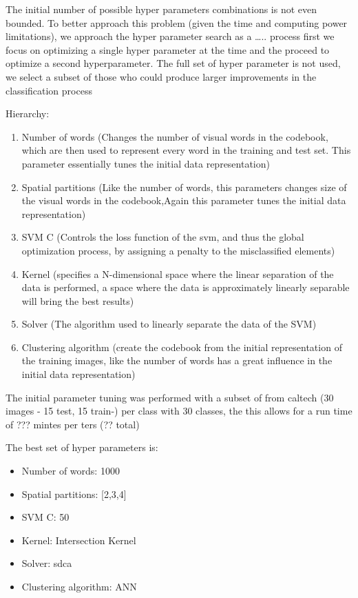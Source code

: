 \documentclass[10pt,twocolumn,letterpaper]{article}
\begin{document}
The initial number of possible hyper parameters combinations is not even bounded. To better approach this problem (given the time and computing power limitations), we approach the hyper parameter search as a ….. process first we focus on optimizing a single hyper parameter at the time and the proceed to optimize a second hyperparameter. The full set of hyper parameter is not used, we select a subset of those who could produce larger improvements in the classification process

Hierarchy:
\begin{enumerate}
	\item Number of words (Changes the number of visual words in the codebook, which are then used to represent every word
in the training and test set. This parameter essentially tunes the initial data representation)
	\item Spatial partitions (Like the number of words,  this parameters changes size of the visual words in the codebook,Again this parameter tunes the initial data  representation)
	\item SVM C (Controls the loss function of the svm, and thus the global optimization process, by assigning a penalty to the misclassified elements)
	\item Kernel (specifies a N-dimensional space where the linear separation of the data is performed, a space where the data is approximately linearly separable will bring the best results)
	\item Solver (The algorithm used to linearly separate the data of the SVM)
	\item Clustering algorithm (create the codebook from the initial representation of the training images, like the number of words has a great influence in the initial data representation)
\end{enumerate}
 

The initial parameter tuning was performed  with a subset of  from caltech (30 images - 15 test, 15 train-) per class with 30 classes, the this allows for a run time of ??? mintes per ters (??  total) 

The best set of hyper parameters is:
\begin{itemize}
	\item Number of words: 1000
	\item Spatial partitions: [2,3,4]
	\item SVM C: 50
	\item Kernel:  Intersection  Kernel
	\item Solver: sdca
	\item Clustering algorithm: ANN
\end{itemize}
\end{document}

